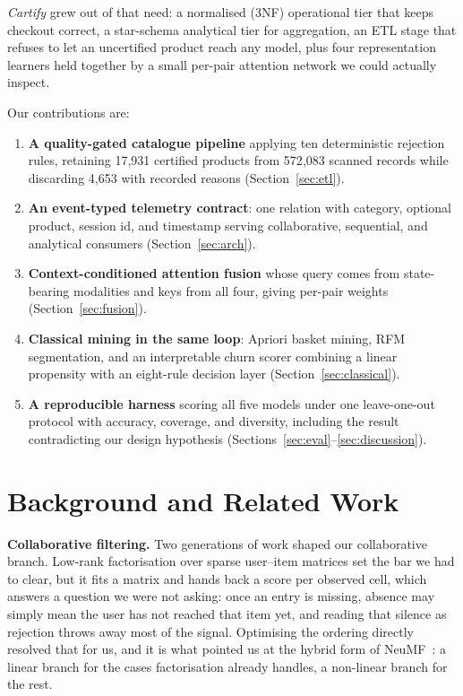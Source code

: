 \documentclass[conference]{IEEEtran}
\begin{document}
\emph{Cartify} grew out of that need: a normalised (3NF) operational tier that keeps
checkout correct, a star-schema analytical tier for aggregation, an ETL stage that
refuses to let an uncertified product reach any model, plus four representation
learners held together by a small per-pair attention network we could actually
inspect.

Our contributions are:

\begin{enumerate}
\item \textbf{A quality-gated catalogue pipeline} applying ten deterministic
rejection rules, retaining 17{,}931 certified products from 572{,}083 scanned
records while discarding 4{,}653 with recorded reasons
(Section~\ref{sec:etl}).
\item \textbf{An event-typed telemetry contract}: one relation with category,
optional product, session id, and timestamp serving collaborative, sequential, and
analytical consumers (Section~\ref{sec:arch}).
\item \textbf{Context-conditioned attention fusion} whose query comes from
state-bearing modalities and keys from all four, giving per-pair weights
(Section~\ref{sec:fusion}).
\item \textbf{Classical mining in the same loop}: Apriori basket mining, RFM
segmentation, and an interpretable churn scorer combining a linear propensity with
an eight-rule decision layer (Section~\ref{sec:classical}).
\item \textbf{A reproducible harness} scoring all five models under one
leave-one-out protocol with accuracy, coverage, and diversity, including the result
contradicting our design hypothesis (Sections~\ref{sec:eval}--\ref{sec:discussion}).
\end{enumerate}

\section{Background and Related Work}
\label{sec:related}

\textbf{Collaborative filtering.} Two generations of work shaped our collaborative
branch. Low-rank factorisation over sparse user--item matrices
\cite{mnih2008pmf,hu2008icdm} set the bar we had to clear, but it fits a matrix and
hands back a score per observed cell, which answers a question we were not asking:
once an entry is missing, absence may simply mean the user has not reached that
item yet, and reading that silence as rejection throws away most of the signal.
Optimising the ordering directly \cite{rendle2009bpr} resolved that for us, and it
is what pointed us at the hybrid form of NeuMF~\cite{he2017ncf}: a linear branch
for the cases factorisation already handles, a non-linear branch for the rest.
\end{document}
